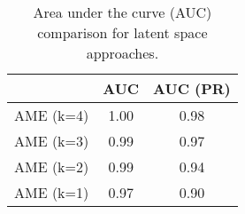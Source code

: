 \begin{table}[ht]
\centering
\begingroup\normalsize
\begin{tabular}{lcc}
  & AUC & AUC (PR) \\ 
  \hline
\hline
AME (k=4) & 1.00 & 0.98 \\ 
  AME (k=3) & 0.99 & 0.97 \\ 
  AME (k=2) & 0.99 & 0.94 \\ 
  AME (k=1) & 0.97 & 0.90 \\ 
  \end{tabular}
\endgroup
\caption{Area under the curve (AUC) comparison for latent space approaches.} 
\label{tab:aucTable_latSpace}
\end{table}

